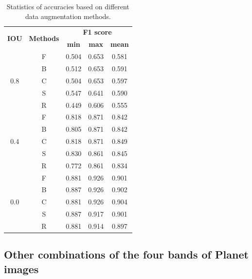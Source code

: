 \documentclass[authoryear,preprint,review,12pt]{elsarticle}
\begin{document}
\begin{table}[ht]
\centering
\footnotesize
\caption{Statistics of accuracies based on different data augmentation methods.}
\label{table_stastic_imgaug}
\begin{tabular}{c c c c  c  }
\toprule
\multirow{2}{*}{\textbf{IOU}}&\multirow{2}{*}{\textbf{Methods}}& \multicolumn{3}{c}{ \textbf{F1 score}} \\
 & &\textbf{min}&\textbf{max}&\textbf{mean}\\
\midrule
\multirow{5}{*}{0.8} &   F & 0.504 & 0.653 & 0.581 \\
  & B & 0.512 & 0.653 & 0.591\\
 & C & 0.504 & 0.653 & 0.597\\
 & S & 0.547 & 0.641 & 0.590\\
& R & 0.449 & 0.606 & 0.555 \\

\midrule
\multirow{5}{*}{0.4} &  F & 0.818 & 0.871 & 0.842 \\
 &  B & 0.805 & 0.871 & 0.842\\
 & C & 0.818 & 0.871 & 0.849\\
 & S & 0.830 & 0.861 & 0.845\\
& R & 0.772 & 0.861 & 0.834\\

\midrule
\multirow{5}{*}{0.0} & F & 0.881 & 0.926 & 0.901 \\
  &B & 0.887 & 0.926 & 0.902\\
  &C & 0.881 & 0.926 & 0.904\\
 &S & 0.887 & 0.917 & 0.901\\
&R & 0.881 & 0.914 & 0.897\\


\bottomrule
\end{tabular}
\end{table}

\subsection{Other combinations of the four bands of Planet images}
\label{subsec_otherbands}
\end{document}
